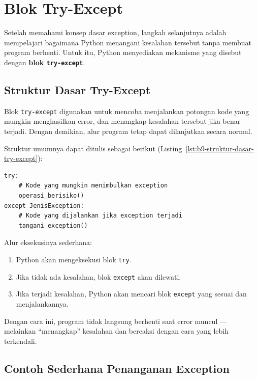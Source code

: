 \section{Blok Try-Except}

Setelah memahami konsep dasar exception, langkah selanjutnya adalah mempelajari bagaimana Python menangani kesalahan tersebut tanpa membuat program berhenti. Untuk itu, Python menyediakan mekanisme yang disebut dengan \textbf{blok \texttt{try-except}}.

\subsection*{Struktur Dasar Try-Except}

Blok \texttt{try-except} digunakan untuk mencoba menjalankan potongan kode yang mungkin menghasilkan error, dan menangkap kesalahan tersebut jika benar terjadi. Dengan demikian, alur program tetap dapat dilanjutkan secara normal.

Struktur umumnya dapat ditulis sebagai berikut (Listing~\ref{lst:b9-struktur-dasar-try-except}):

\begin{lstlisting}[style=PythonStyle, caption={Struktur dasar try-except di Python}, label={lst:b9-struktur-dasar-try-except}]
try:
    # Kode yang mungkin menimbulkan exception
    operasi_berisiko()
except JenisException:
    # Kode yang dijalankan jika exception terjadi
    tangani_exception()
\end{lstlisting}

Alur eksekusinya sederhana:
\begin{enumerate}
    \item Python akan mengeksekusi blok \texttt{try}.
    \item Jika tidak ada kesalahan, blok \texttt{except} akan dilewati.
    \item Jika terjadi kesalahan, Python akan mencari blok \texttt{except} yang sesuai dan menjalankannya.
\end{enumerate}

Dengan cara ini, program tidak langsung berhenti saat error muncul — melainkan “menangkap” kesalahan dan bereaksi dengan cara yang lebih terkendali.

\subsection*{Contoh Sederhana Penanganan Exception}

